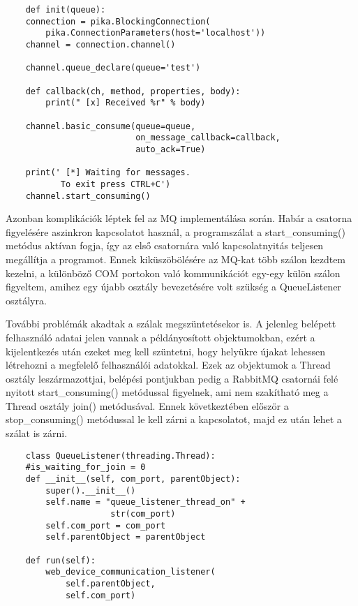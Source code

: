 \documentclass[12pt]{report}
\begin{document}
\begin{verbatim}
    def init(queue):
    connection = pika.BlockingConnection(
        pika.ConnectionParameters(host='localhost'))
    channel = connection.channel()

    channel.queue_declare(queue='test')

    def callback(ch, method, properties, body):
        print(" [x] Received %r" % body)

    channel.basic_consume(queue=queue, 
                          on_message_callback=callback, 
                          auto_ack=True)

    print(' [*] Waiting for messages.
           To exit press CTRL+C')
    channel.start_consuming()

\end{verbatim}

Azonban komplikációk léptek fel az MQ implementálása során. Habár a csatorna figyelésére aszinkron kapcsolatot használ, a programszálat a start\_consuming() metódus aktívan fogja, így az első csatornára való kapcsolatnyitás teljesen megállítja a programot.
Ennek kiküszöbölésére az MQ-kat több szálon kezdtem kezelni, a különböző COM portokon való kommunikációt egy-egy külön szálon figyeltem, amihez egy újabb osztály bevezetésére volt szükség a QueueListener osztályra.

További problémák akadtak a szálak megszüntetésekor is.
A jelenleg belépett felhasználó adatai jelen vannak a példányosított objektumokban, ezért a kijelentkezés után ezeket meg kell szüntetni, hogy helyükre újakat lehessen létrehozni a megfelelő felhasználói adatokkal.
Ezek az objektumok a Thread osztály leszármazottjai, belépési pontjukban pedig a RabbitMQ csatornái felé nyitott start\_consuming() metódussal figyelnek, ami nem szakítható meg a Thread osztály join() metódusával. Ennek következtében először a stop\_consuming() metódussal le kell zárni a kapcsolatot, majd ez után lehet a szálat is zárni.


\begin{verbatim}
    class QueueListener(threading.Thread):
    #is_waiting_for_join = 0
    def __init__(self, com_port, parentObject):
        super().__init__()
        self.name = "queue_listener_thread_on" +
                     str(com_port)
        self.com_port = com_port
        self.parentObject = parentObject

    def run(self):
        web_device_communication_listener(
            self.parentObject,
            self.com_port)
\end{verbatim}
\end{document}
